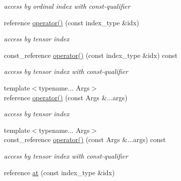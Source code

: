 \begin{DoxyCompactItemize}
\begin{DoxyCompactList}\small\item\em access by ordinal index with const-\/qualifier \item\end{DoxyCompactList}\item 
\hypertarget{classbtas_1_1_tensor_aa5c4f12e59edcac76a97a4b7ff9254d1}{
reference \hyperlink{classbtas_1_1_tensor_aa5c4f12e59edcac76a97a4b7ff9254d1}{operator()} (const index\_\-type \&idx)}
\label{classbtas_1_1_tensor_aa5c4f12e59edcac76a97a4b7ff9254d1}

\begin{DoxyCompactList}\small\item\em access by tensor index \item\end{DoxyCompactList}\item 
\hypertarget{classbtas_1_1_tensor_a665b87c4e3ff172cd78ae48fa13c1b10}{
const\_\-reference \hyperlink{classbtas_1_1_tensor_a665b87c4e3ff172cd78ae48fa13c1b10}{operator()} (const index\_\-type \&idx) const }
\label{classbtas_1_1_tensor_a665b87c4e3ff172cd78ae48fa13c1b10}

\begin{DoxyCompactList}\small\item\em access by tensor index with const-\/qualifier \item\end{DoxyCompactList}\item 
\hypertarget{classbtas_1_1_tensor_a221a293c47f89523354c5ed6bddbbe93}{
{\footnotesize template$<$typename... Args$>$ }\\reference \hyperlink{classbtas_1_1_tensor_a221a293c47f89523354c5ed6bddbbe93}{operator()} (const Args \&...args)}
\label{classbtas_1_1_tensor_a221a293c47f89523354c5ed6bddbbe93}

\begin{DoxyCompactList}\small\item\em access by tensor index \item\end{DoxyCompactList}\item 
\hypertarget{classbtas_1_1_tensor_ae438e78d82a95622865bed2af7ab5523}{
{\footnotesize template$<$typename... Args$>$ }\\const\_\-reference \hyperlink{classbtas_1_1_tensor_ae438e78d82a95622865bed2af7ab5523}{operator()} (const Args \&...args) const }
\label{classbtas_1_1_tensor_ae438e78d82a95622865bed2af7ab5523}

\begin{DoxyCompactList}\small\item\em access by tensor index with const-\/qualifier \item\end{DoxyCompactList}\item 
\hypertarget{classbtas_1_1_tensor_a7a6a005917b830d744986b80fab8e93b}{
reference \hyperlink{classbtas_1_1_tensor_a7a6a005917b830d744986b80fab8e93b}{at} (const index\_\-type \&idx)}
\label{classbtas_1_1_tensor_a7a6a005917b830d744986b80fab8e93b}


\end{DoxyCompactItemize}
